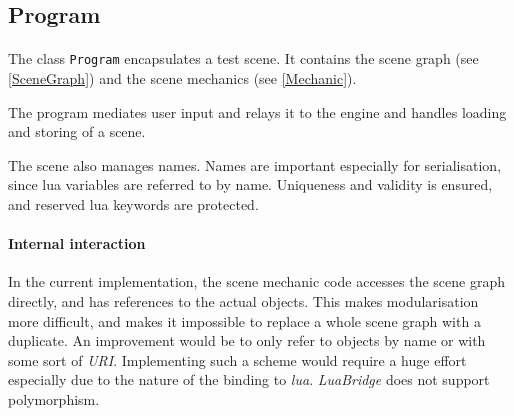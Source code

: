 \subsection{Program}
\paragraph{}
The class \lstinline{Program} encapsulates a test scene.
It contains the scene graph (see \ref{SceneGraph}) and the scene mechanics (see \ref{Mechanic}).

The program mediates user input and relays it to the engine
and handles loading and storing of a scene.

The scene also manages names.
Names are important especially for serialisation, since lua variables are referred to by name.
Uniqueness and validity is ensured, and reserved lua keywords are protected.

\paragraph{Internal interaction}
In the current implementation, the scene mechanic code accesses the scene graph directly,
and has references to the actual objects.
This makes modularisation more difficult, and makes it impossible to replace a whole scene graph with a duplicate.
An improvement would be to only refer to objects by name or with some sort of \textit{URI}.
Implementing such a scheme would require a huge effort especially due to the nature of the binding to \textit{lua}.
\textit{LuaBridge} does not support polymorphism.

